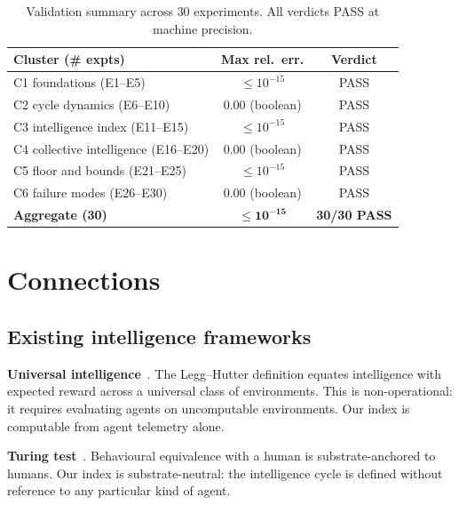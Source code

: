\documentclass[11pt,twocolumn,a4paper]{article}
\begin{document}
\begin{table}[h!]\centering
\begin{tabular}{lcc}
\toprule
\textbf{Cluster (\# expts)} & \textbf{Max rel.\ err.} & \textbf{Verdict}\\\midrule
C1 foundations (E1--E5)              & $\le 10^{-15}$               & PASS\\
C2 cycle dynamics (E6--E10)          & $0.00$ (boolean)             & PASS\\
C3 intelligence index (E11--E15)     & $\le 10^{-15}$               & PASS\\
C4 collective intelligence (E16--E20)& $0.00$ (boolean)             & PASS\\
C5 floor and bounds (E21--E25)       & $\le 10^{-15}$               & PASS\\
C6 failure modes (E26--E30)          & $0.00$ (boolean)             & PASS\\\midrule
\textbf{Aggregate (30)}              & $\mathbf{\le 10^{-15}}$      & \textbf{30/30 PASS}\\\bottomrule
\end{tabular}
\caption{Validation summary across $30$ experiments. All verdicts PASS at machine
precision.}
\label{tab:validation}
\end{table}



\section{Connections}
\label{sec:connections}

\subsection{Existing intelligence frameworks}

\textbf{Universal intelligence}~\cite{legghutter2007,hutter2005}. The Legg--Hutter
definition equates intelligence with expected reward across a universal class of
environments. This is non-operational: it requires evaluating agents on uncomputable
environments. Our index is computable from agent telemetry alone.

\textbf{Turing test}~\cite{turing1950}. Behavioural equivalence with a human is
substrate-anchored to humans. Our index is substrate-neutral: the intelligence cycle is
defined without reference to any particular kind of agent.
\end{document}
